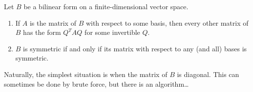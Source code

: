\begin{lemm}{}{}
	Let $B$ be a bilinear form on a finite-dimensional vector space.
	\begin{enumerate}
	  \item If $A$ is the matrix of $B$ with respect to some basis, then every other matrix of $B$ has the form $Q^TAQ$ for some invertible $Q$.
	  \item $B$ is symmetric if and only if its matrix with respect to any (and all) bases is symmetric.
	\end{enumerate}
\end{lemm}

Naturally, the simplest situation is when the matrix of $B$ is diagonal. This can sometimes be done by brute force, but there is an algorithm\ldots


\pagebreak[3]


